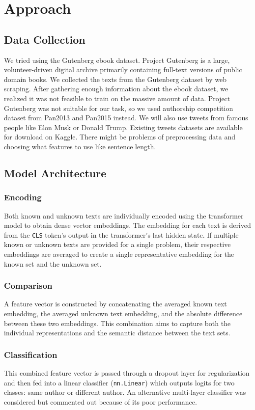 \documentclass[12pt,a4paper]{article}
\begin{document}
\section{Approach}
\subsection{Data Collection}
We tried using the Gutenberg ebook dataset. Project Gutenberg is a large, volunteer-driven digital archive primarily containing full-text versions of public domain books. We collected the texts from the Gutenberg dataset by web scraping. After gathering enough information about the ebook dataset, we realized it was not feasible to train on the massive amount of data. Project Gutenberg was not suitable for our task, so we used authorship competition dataset from Pan2013 and Pan2015 instead. We will also use tweets from famous people like Elon Musk or Donald Trump. Existing tweets datasets are available for download on Kaggle. There might be problems of preprocessing data and choosing what features to use like sentence length.

\subsection{Model Architecture}
\subsubsection{Encoding}
Both known and unknown texts are individually encoded using the transformer model to obtain dense vector embeddings. The embedding for each text is derived from the \texttt{CLS} token's output in the transformer's last hidden state. If multiple known or unknown texts are provided for a single problem, their respective embeddings are averaged to create a single representative embedding for the known set and the unknown set.

\subsubsection{Comparison}
A feature vector is constructed by concatenating the averaged known text embedding, the averaged unknown text embedding, and the absolute difference between these two embeddings. This combination aims to capture both the individual representations and the semantic distance between the text sets.

\subsubsection{Classification}
This combined feature vector is passed through a dropout layer for regularization and then fed into a linear classifier (\texttt{nn.Linear}) which outputs logits for two classes: same author or different author. An alternative multi-layer classifier was considered but commented out because of its poor performance.
\end{document}
